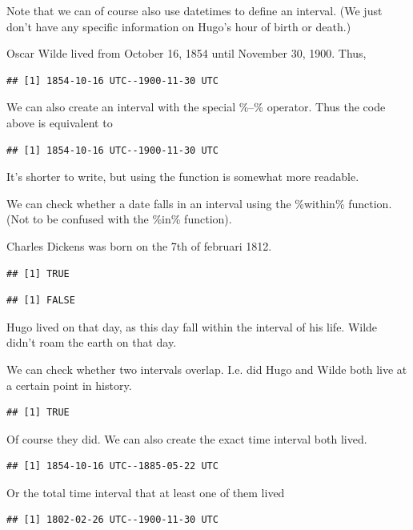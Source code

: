 \documentclass[]{tufte-book}
\begin{document}
Note that we can of course also use datetimes to define an interval. (We just don't have any specific information on Hugo's hour of birth or death.)

Oscar Wilde lived from October 16, 1854 until November 30, 1900. Thus,

\begin{verbatim}
## [1] 1854-10-16 UTC--1900-11-30 UTC
\end{verbatim}

We can also create an interval with the special \%--\% operator. Thus the code above is equivalent to

\begin{verbatim}
## [1] 1854-10-16 UTC--1900-11-30 UTC
\end{verbatim}

It's shorter to write, but using the function is somewhat more readable.

We can check whether a date falls in an interval using the \%within\% function. (Not to be confused with the \%in\% function).

Charles Dickens was born on the 7th of februari 1812.

\begin{verbatim}
## [1] TRUE
\end{verbatim}

\begin{verbatim}
## [1] FALSE
\end{verbatim}

Hugo lived on that day, as this day fall within the interval of his life. Wilde didn't roam the earth on that day.

We can check whether two intervals overlap. I.e. did Hugo and Wilde both live at a certain point in history.

\begin{verbatim}
## [1] TRUE
\end{verbatim}

Of course they did. We can also create the exact time interval both lived.

\begin{verbatim}
## [1] 1854-10-16 UTC--1885-05-22 UTC
\end{verbatim}

Or the total time interval that at least one of them lived

\begin{verbatim}
## [1] 1802-02-26 UTC--1900-11-30 UTC
\end{verbatim}
\end{document}
